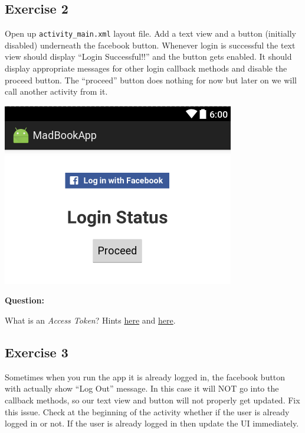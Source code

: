\subsection{Exercise 2}
\label{FBI:exercise2}
Open up \texttt{activity\_main.xml} layout file. Add a text view and a button (initially disabled) underneath the facebook button. Whenever login is successful the text view should display ``Login Successful!!'' and the button gets enabled. It should display appropriate messages for other login callback methods and disable the proceed button. The ``proceed'' button does nothing for now but later on we will call another activity from it.

\begin{center}
	\includegraphics[scale=\SourceCodeScale]{chapters/ch12/images/27}
\end{center}

\textbf{Question:} 

What is an \textit{Access Token}? Hints \href{https://developers.facebook.com/docs/facebook-login/access-tokens/}{here} and \href{https://developers.facebook.com/docs/marketing-api/authentication}{here}.

\subsection{Exercise 3}
\label{FBI:exercise3}
Sometimes when you run the app it is already logged in, the facebook button with actually show ``Log Out'' message. In this case it will NOT go into the callback methods, so our text view and button will not properly get updated. Fix this issue. Check at the beginning of the activity whether if the user is already logged in or not. If the user is already logged in then update the UI immediately.

